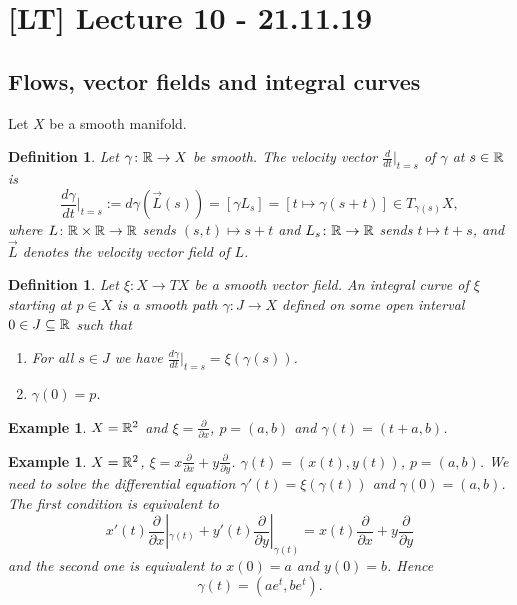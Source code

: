 \documentclass[A4paper, british]{amsart}
\theoremstyle{darkgreentheorem}
\theoremstyle{darkbluedefinition}
\newtheorem{defn}[thm]{Definition}
\theoremstyle{darkredexample}
\newtheorem{exa}[thm]{Example}
\theoremstyle{remark}
\newcommand{\1}{\mathbbm{1}}
\newcommand{\tms}{\times}
\newcommand{\sub}{\subseteq}
\begin{document}
\section{[LT] Lecture 10 - 21.11.19}

\subsection{Flows, vector fields and integral curves}

Let $X$ be a smooth manifold.

\begin{defn}
    Let $\gamma\colon \mathbb{R}\to X$ be smooth.
    The \textit{velocity vector} $\frac{d}{dt}|_{t=s}$ of $\gamma$ at $s\in \mathbb{R}$ is
    \[ \frac{d\gamma}{dt}|_{t=s}:=d\gamma(\vec{L}(s))=[\gamma L_{s}]=[t\mapsto \gamma(s+t)]\in T_{\gamma(s)}X, \]
    where $L\colon \R\tms \R\to \R$ sends $(s,t)\mapsto s+t$ and $L_{s}\colon \mathbb{R}\to \mathbb{R}$ sends $t\mapsto t
    +s$, and $\vec{L}$ denotes the velocity vector field of $L$.
\end{defn}

\begin{defn}
    Let $\xi\colon X\to TX$ be a smooth vector field.
    An \textit{integral curve} of $\xi$ starting at $p\in X$ is a smooth path $\gamma\colon J\to X$ defined on some open interval $0\in J\sub \R$ such that
    \begin{enumerate}
	\item For all $s\in J$ we have $\frac{d\gamma}{dt}|_{t=s}=\xi(\gamma(s))$.
	\item $\gamma(0)=p$.
    \end{enumerate}
\end{defn}

\begin{exa}
    $X=\mathbb{R}^{2}$ and $\xi=\frac{\partial}{\partial x}$, $p=(a,b)$ and $\gamma(t)=(t+a,b)$.
\end{exa}

\begin{exa}
    $X=\mathbb{R}^{2}$, $\xi=x\frac{\partial}{\partial x}+y\frac{\partial}{\partial y}$.
    $\gamma(t)=(x(t),y(t))$, $p=(a,b)$.
    We need to solve the differential equation $\gamma'(t)=\xi(\gamma(t))$ and $\gamma(0)=(a,b)$.
    The first condition is equivalent to
    \[ x'(t)\frac{\partial}{\partial x}|_{\gamma(t)}+y'(t)\frac{\partial }{\partial y}|_{\gamma(t)}=x(t)\frac{\partial }{\partial x} + y\frac{\partial }{\partial y} \]
    and the second one is equivalent to $x(0)=a$ and $y(0)=b$.
    Hence
    \[ \gamma(t)=(ae^{t},be^{t}).\]
\end{exa}
\end{document}
